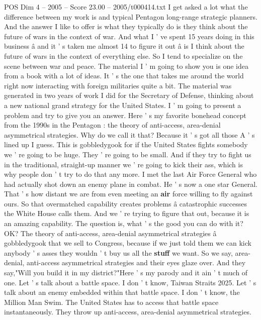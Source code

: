 \begin{textsample}{POS Dim 4 – 2005 – Score 23.00 – 2005/t000414.txt}  \label{ex:f4_pos_015}
I get asked a lot what the difference between my work is and typical Pentagon long-range strategic planners.
And the answer I like to offer is what they typically do is they think about the future of wars in the context of war.
And what I ' ve spent 15 years doing in this business â and it ' s taken me almost 14 to figure it out â is I think about the future of wars in the context of everything else.
So I tend to specialize on the scene between war and peace.
The material I ' m going to show you is one idea from a book with a lot of ideas.
It ' s the one that takes me around the world right now interacting with foreign militaries quite a bit.
The material was generated in two years of work I did for the Secretary of Defense, thinking about a new national grand strategy for the United States.
I ' m going to present a problem and try to give you an answer.
Here ' s my favorite bonehead concept from the 1990s in the Pentagon : the theory of anti-access, area-denial asymmetrical strategies.
Why do we call it that?
Because it ' s got all those A ' s lined up I guess.
This is gobbledygook for if the United States fights somebody we ' re going to be huge.
They ' re going to be small.
And if they try to fight us in the traditional, straight-up manner we ' re going to kick their ass, which is why people don ' t try to do that any more.
I met the last Air Force General who had actually shot down an enemy plane in combat.
He ' s now a one star General.
That ' s how distant we are from even meeting an \textbf{air} force willing to fly against ours.
So that overmatched capability creates problems â catastrophic successes the White House calls them.
And we ' re trying to figure that out, because it is an amazing capability.
The question is, what ' s the good you can do with it?
OK?
The theory of anti-access, area-denial asymmetrical strategies â gobbledygook that we sell to Congress, because if we just told them we can kick anybody ' s asses they wouldn ' t buy us all the \textbf{stuff} we want.
So we say, area-denial, anti-access asymmetrical strategies and their eyes glaze over.
And they say,"Will you build it in my district?"Here ' s my parody and it ain ' t much of one.
Let ' s talk about a battle space.
I don ' t know, Taiwan Straits 2025.
Let ' s talk about an enemy embedded within that battle space.
I don ' t know, the Million Man Swim.
The United States has to access that battle space instantaneously.
They throw up anti-access, area-denial asymmetrical strategies.

\end{textsample}
